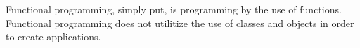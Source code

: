 Functional programming, simply put, is programming by the use of functions. Functional programming does not utilitize the use of
classes and objects in order to create applications.
